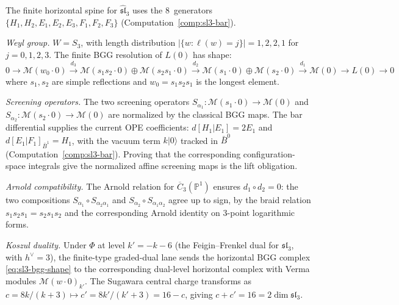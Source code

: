 \begin{example}
\label{ex:sl3-bgg-computation}
The finite horizontal spine for $\widehat{\mathfrak{sl}}_3$ uses the
$8$~generators
$\{H_1, H_2, E_1, E_2, E_3, F_1, F_2, F_3\}$
(Computation~\ref{comp:sl3-bar}).

\emph{Weyl group.}
$W = S_3$, with length distribution
$|\{w : \ell(w) = j\}| = 1, 2, 2, 1$ for $j = 0, 1, 2, 3$.
The finite BGG resolution of $L(0)$ has shape:
\begin{equation}\label{eq:sl3-bgg-shape}
0 \to \mathcal{M}(w_0 \cdot 0)
\xrightarrow{d_3}
\mathcal{M}(s_1 s_2 \cdot 0) \oplus \mathcal{M}(s_2 s_1 \cdot 0)
\xrightarrow{d_2}
\mathcal{M}(s_1 \cdot 0) \oplus \mathcal{M}(s_2 \cdot 0)
\xrightarrow{d_1}
\mathcal{M}(0) \to L(0) \to 0
\end{equation}
where $s_1, s_2$ are simple reflections and $w_0 = s_1 s_2 s_1$
is the longest element.

\emph{Screening operators.}
The two screening operators
$S_{\alpha_1}\colon \mathcal{M}(s_1 \cdot 0) \to \mathcal{M}(0)$
and
$S_{\alpha_2}\colon \mathcal{M}(s_2 \cdot 0) \to \mathcal{M}(0)$
are normalized by the classical BGG maps. The bar differential
supplies the current OPE coefficients:
$d[H_1|E_1]=2E_1$ and
$d[E_1|F_1]_{\bar B^1}=H_1$, with the vacuum term
$k|0\rangle$ tracked in $\bar B^0$
(Computation~\ref{comp:sl3-bar}). Proving that the corresponding
configuration-space integrals give the normalized affine screening
maps is the lift obligation.

\emph{Arnold compatibility.}
The Arnold relation for $\overline{C}_3(\mathbb{P}^1)$
ensures $d_1 \circ d_2 = 0$: the two compositions
$S_{\alpha_1} \circ S_{\alpha_2 \alpha_1}$ and
$S_{\alpha_2} \circ S_{\alpha_1 \alpha_2}$
agree up to sign, by the braid relation
$s_1 s_2 s_1 = s_2 s_1 s_2$ and the corresponding
Arnold identity on $3$-point logarithmic forms.

\emph{Koszul duality.}
Under $\Phi$ at level $k' = -k - 6$ (the Feigin--Frenkel dual
for $\mathfrak{sl}_3$, with $h^\vee = 3$), the finite-type
graded-dual lane sends the horizontal BGG complex
\eqref{eq:sl3-bgg-shape} to the corresponding dual-level
horizontal complex with Verma modules $\mathcal{M}(w \cdot 0)_{k'}$.
The Sugawara central charge transforms as
$c = 8k/(k+3) \mapsto c' = 8k'/(k'+3) = 16 - c$,
giving $c + c' = 16 = 2 \dim \mathfrak{sl}_3$.
\end{example}

